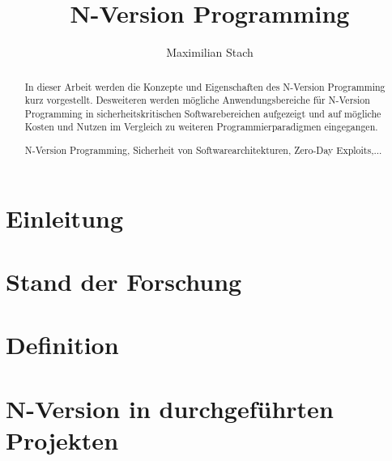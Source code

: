 \documentclass[runningheads,a4paper]{llncs}
\newcommand{\keywords}[1]{\par\addvspace\baselineskip
\noindent\keywordname\enspace\ignorespaces#1}
\begin{document}
\mainmatter  %

\title{N-Version Programming}



\author{Maximilian Stach}
%




\maketitle


\begin{abstract}
In dieser Arbeit werden die Konzepte und Eigenschaften des N-Version Programming kurz vorgestellt. Desweiteren werden mögliche Anwendungsbereiche für N-Version Programming in sicherheitskritischen Softwarebereichen aufgezeigt und auf mögliche Kosten und Nutzen im Vergleich zu weiteren Programmierparadigmen eingegangen.
\keywords{N-Version Programming, Sicherheit von Softwarearchitekturen, Zero-Day Exploits,...}
\end{abstract}
\tableofcontents

\cleardoublepage

\section{Einleitung} \label{einleitung}



\section{Stand der Forschung} \label{stand}



\section{Definition} \label{definition}


\section{N-Version in durchgeführten Projekten} \label{beispiele}

\end{document}
